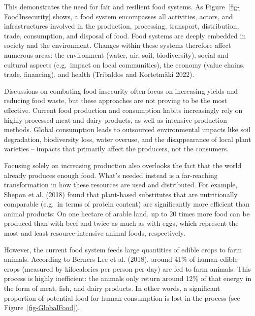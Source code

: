 \documentclass[
  a4paper,
  DIV=11,
  numbers=noendperiod,
  oneside,
  openany]{scrreprt}
\begin{document}
This demonstrates the need for fair and resilient food systems. As
Figure~\ref{fig-FoodInsecurity} shows, a food system encompasses all
activities, actors, and infrastructures involved in the production,
processing, transport, distribution, trade, consumption, and disposal of
food. Food systems are deeply embedded in society and the environment.
Changes within these systems therefore affect numerous areas: the
environment (water, air, soil, biodiversity), social and cultural
aspects (e.g.~impact on local communities), the economy (value chains,
trade, financing), and health (Tribaldos and Kortetmäki 2022).

Discussions on combating food insecurity often focus on increasing
yields and reducing food waste, but these approaches are not proving to
be the most effective. Current food production and consumption habits
increasingly rely on highly processed meat and dairy products, as well
as intensive production methods. Global consumption leads to outsourced
environmental impacts like soil degradation, biodiversity loss, water
overuse, and the disappearance of local plant varieties -- impacts that
primarily affect the producers, not the consumers.

Focusing solely on increasing production also overlooks the fact that
the world already produces enough food. What's needed instead is a
far-reaching transformation in how these resources are used and
distributed. For example, Shepon et al. (2018) found that plant-based
substitutes that are nutritionally comparable (e.g.~in terms of protein
content) are significantly more efficient than animal products: On one
hectare of arable land, up to 20 times more food can be produced than
with beef and twice as much as with eggs, which represent the most and
least resource-intensive animal foods, respectively.

However, the current food system feeds large quantities of edible crops
to farm animals. According to Berners-Lee et al. (2018), around 41\% of
human-edible crops (measured by kilocalories per person per day) are fed
to farm animals. This process is highly inefficient: the animals only
return around 12\% of that energy in the form of meat, fish, and dairy
products. In other words, a significant proportion of potential food for
human consumption is lost in the process (see
Figure~\ref{fig-GlobalFood}).
\end{document}
